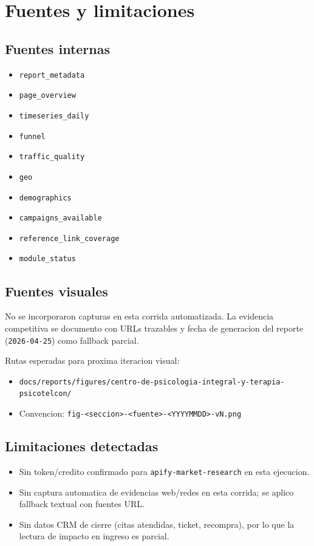 \documentclass[9pt,a4paper,twocolumn,twoside]{tau-class/tau}
\begin{document}
\section{Fuentes y limitaciones}

\subsection{Fuentes internas}
\begin{itemize}
  \item \texttt{report\_metadata}
  \item \texttt{page\_overview}
  \item \texttt{timeseries\_daily}
  \item \texttt{funnel}
  \item \texttt{traffic\_quality}
  \item \texttt{geo}
  \item \texttt{demographics}
  \item \texttt{campaigns\_available}
  \item \texttt{reference\_link\_coverage}
  \item \texttt{module\_status}
\end{itemize}

\subsection{Fuentes visuales}
No se incorporaron capturas en esta corrida automatizada. La evidencia competitiva se documento con URLs trazables y fecha de generacion del reporte (\texttt{2026-04-25}) como fallback parcial.

Rutas esperadas para proxima iteracion visual:
\begin{itemize}
  \item \texttt{docs/reports/figures/centro-de-psicologia-integral-y-terapia-psicotelcon/}
  \item Convencion: \texttt{fig-<seccion>-<fuente>-<YYYYMMDD>-vN.png}
\end{itemize}

\subsection{Limitaciones detectadas}
\begin{itemize}
  \item Sin token/credito confirmado para \texttt{apify-market-research} en esta ejecucion.
  \item Sin captura automatica de evidencias web/redes en esta corrida; se aplico fallback textual con fuentes URL.
  \item Sin datos CRM de cierre (citas atendidas, ticket, recompra), por lo que la lectura de impacto en ingreso es parcial.
\end{itemize}
\end{document}
